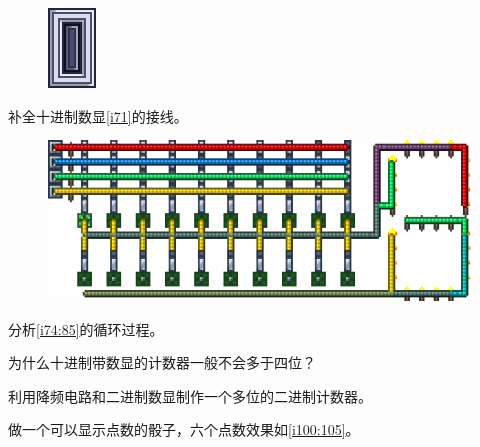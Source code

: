 \begin{problemset}
\begin{figure}[h]
\begin{center}
{\includegraphics{images/69.png}
}
\qquad
{}
\end{center}
\caption{}
\label{i69:70}
\end{figure}
\item 补全十进制数显\autoref{i71}的接线。
\begin{figure}[h]
\centering
\includegraphics{images/71.png}
\caption{}
\label{i71}
\end{figure}
\item 分析\autoref{i74:85}的循环过程。
\item 为什么十进制带数显的计数器一般不会多于四位？
\item 利用降频电路和二进制数显制作一个多位的二进制计数器。
\item 做一个可以显示点数的骰子，六个点数效果如\autoref{i100:105}。
\begin{figure}[h]
\begin{center}
\end{center}
\end{figure}
\end{problemset}

